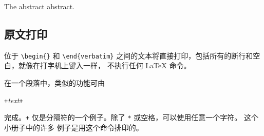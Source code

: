 \newenvironment{abstract}%
        {\begin{center}\begin{small}\begin{minipage}{0.8\textwidth}}%
        {\end{minipage}\end{small}\end{center}}
\begin{example}
\begin{abstract}
The abstract abstract.
\end{abstract}
\end{example}

\subsection{原文打印}

位于 \verb|\begin{|\verb|}| 和 \verb|\end{verbatim}| 
之间的文本将直接打印，包括所有的断行和空白，就像在打字机上键入一样，
不执行任何 \LaTeX{} 命令。

在一个段落中，类似的功能可由
\begin{lscommand}
\verb|+|\emph{text}\verb|+|
\end{lscommand}
\noindent 完成。\verb|+| 仅是分隔符的一个例子。除了 \verb|*| 
或空格，可以使用任意一个字符。 这个小册子中的许多%
例子是用这个命令排印的。


